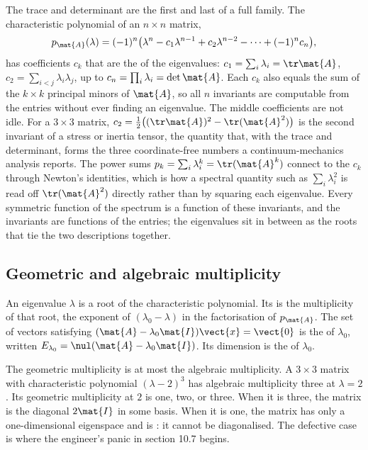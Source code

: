 \begin{mastery}
The trace and determinant are the first and last of a full family. The
characteristic polynomial of an $n \times n$ matrix,
\[
p_{\mat{A}}(\lambda) = (-1)^{n}\bigl(\lambda^{n} - c_{1}\lambda^{n-1}
+ c_{2}\lambda^{n-2} - \cdots + (-1)^{n}c_{n}\bigr),
\]
has coefficients $c_{k}$ that are the  of the eigenvalues: $c_{1} = \sum_i \lambda_i = \tr\mat{A}$,
$c_{2} = \sum_{i<j}\lambda_i\lambda_j$, up to $c_{n} = \prod_i
\lambda_i = \det\mat{A}$. Each $c_{k}$ also equals the sum of the
$k \times k$ principal minors of $\mat{A}$, so all $n$ invariants are
computable from the entries without ever finding an eigenvalue. The
middle coefficients are not idle. For a $3 \times 3$ matrix, $c_{2} =
\tfrac{1}{2}\bigl((\tr\mat{A})^{2} - \tr(\mat{A}^{2})\bigr)$ is the
second invariant of a stress or inertia tensor, the quantity that,
with the trace and determinant, forms the three coordinate-free
numbers a continuum-mechanics analysis reports. The power sums
$p_k = \sum_i \lambda_i^k = \tr(\mat{A}^k)$ connect to the $c_k$
through Newton's identities, which is how a spectral quantity such as
$\sum_i \lambda_i^{2}$ is read off $\tr(\mat{A}^2)$ directly rather
than by squaring each eigenvalue. Every symmetric function of the
spectrum is a function of these invariants, and the invariants are
functions of the entries; the eigenvalues sit in between as the roots
that tie the two descriptions together.
\end{mastery}

\subsection{Geometric and algebraic multiplicity}

An eigenvalue $\lambda$ is a root of the characteristic polynomial.
Its  is the multiplicity of that
root, the exponent of $(\lambda_{0} - \lambda)$ in the factorisation
of $p_{\mat{A}}$. The set of vectors satisfying $(\mat{A} -
\lambda_{0} \mat{I}) \vect{x} = \vect{0}$ is the 
of $\lambda_{0}$, written $E_{\lambda_{0}} = \nul(\mat{A} -
\lambda_{0} \mat{I})$. Its dimension is the  of $\lambda_{0}$.

The geometric multiplicity is at most the algebraic multiplicity. A
$3 \times 3$ matrix with characteristic polynomial $(\lambda - 2)^{3}$
has algebraic multiplicity three at $\lambda = 2$. Its geometric
multiplicity at $2$ is one, two, or three. When it is three, the
matrix is the diagonal $2 \mat{I}$ in some basis. When it is one,
the matrix has only a one-dimensional eigenspace and is
: it cannot be diagonalised. The defective case
is where the engineer's panic in section 10.7 begins.

